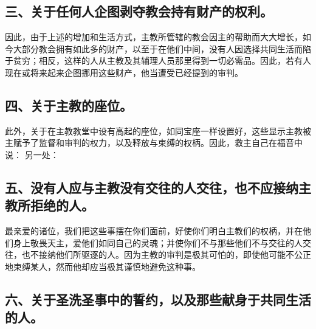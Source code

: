\subsection{三、关于任何人企图剥夺教会持有财产的权利。}

因此，由于上述的增加和生活方式，主教所管辖的教会因主的帮助而大大增长，如今大部分教会拥有如此多的财产，以至于在他们中间，没有人因选择共同生活而陷于贫穷；相反，这样的人从主教及其辅理人员那里得到一切必需品。因此，若有人现在或将来起来企图挪用这些财产，他当遭受已经提到的审判。\par


\subsection{四、关于主教的座位。}

此外，关于在主教教堂中设有高起的座位，如同宝座一样设置好，这些显示主教被主赋予了监督和审判的权力，以及释放与束缚的权柄。因此，救主自己在福音中说： 另一处：\par


\subsection{五、没有人应与主教没有交往的人交往，也不应接纳主教所拒绝的人。}

最亲爱的诸位，我们把这些事摆在你们面前，好使你们明白主教们的权柄，并在他们身上敬畏天主，爱他们如同自己的灵魂；并使你们不与那些他们不与交往的人交往，也不接纳他们所驱逐的人。因为主教的审判是极其可怕的，即使他可能不公正地束缚某人，然而他却应当极其谨慎地避免这种事。\par


\subsection{六、关于圣洗圣事中的誓约，以及那些献身于共同生活的人。}

